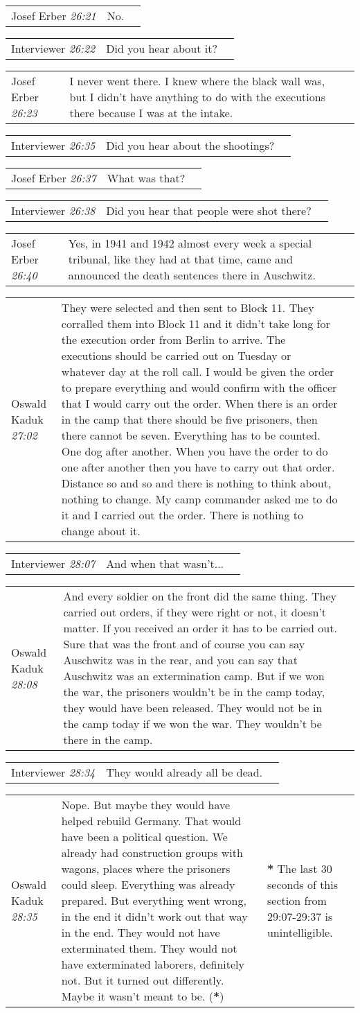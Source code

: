 \documentclass{article}
\newcommand{\I}{Interviewer}
\newcommand{\OK}{Oswald Kaduk}
\newcommand{\JE}{Josef Erber}
\newcommand{\dialogueentry}[4]{
    \begin{center}
    \begin{tabular}{p{1in} p{3.5in} p{1.5in}} 
        #2 \newline \textit{#1} & #3 & \small{#4} 
    \end{tabular}
    \end{center}
}
\newcommand{\seenote}[1]{\textbf{#1}}
\newcommand{\twolinebreak}{\newline \newline}
\begin{document}
\dialogueentry{26:21}{\JE}{No.}{}

\dialogueentry{26:22}{\I}{Did you hear about it?}{}

\dialogueentry{26:23}{\JE}{I never went there. I knew where the black wall was, but I didn't have anything to do with the executions there because I was at the intake.}{}

\dialogueentry{26:35}{\I}{Did you hear about the shootings?}{}

\dialogueentry{26:37}{\JE}{What was that?}{}

\dialogueentry{26:38}{\I}{Did you hear that people were shot there?}{}

\dialogueentry{26:40}{\JE}{Yes, in 1941 and 1942 almost every week a special tribunal, like they had at that time, came and announced the death sentences there in Auschwitz.}{}

\dialogueentry{27:02}{\OK}{They were selected and then sent to Block 11. They corralled them into Block 11 and it didn't take long for the execution order from Berlin to arrive. The executions should be carried out on Tuesday or whatever day at the roll call. I would be given the order to prepare everything and would confirm with the officer that I would carry out the order. 
\twolinebreak
When there is an order in the camp that there should be five prisoners, then there cannot be seven. Everything has to be counted. One dog after another. When you have the order to do one after another then you have to carry out that order. Distance so and so and there is nothing to think about, nothing to change. My camp commander asked me to do it and I carried out the order. There is nothing to change about it.}{}

\dialogueentry{28:07}{\I}{And when that wasn't...}{}

\dialogueentry{28:08}{\OK}{And every soldier on the front did the same thing. They carried out orders, if they were right or not, it doesn't matter. If you received an order it has to be carried out.
\twolinebreak
Sure that was the front and of course you can say Auschwitz was in the rear, and you can say that Auschwitz was an extermination camp. But if we won the war, the prisoners wouldn't be in the camp today, they would have been released. They would not be in the camp today if we won the war. They wouldn't be there in the camp.}{}

\dialogueentry{28:34}{\I}{They would already all be dead.}{}

\dialogueentry{28:35}{\OK}{Nope. But maybe they would have helped rebuild Germany. That would have been a political question. We already had construction groups with wagons, places where the prisoners could sleep. Everything was already prepared. But everything went wrong, in the end it didn't work out that way in the end. They would not have exterminated them. They would not have exterminated laborers, definitely not. But it turned out differently. Maybe it wasn't meant to be. (\seenote{*})}{\seenote{*} The last 30 seconds of this section from 29:07-29:37 is unintelligible.}
\end{document}
